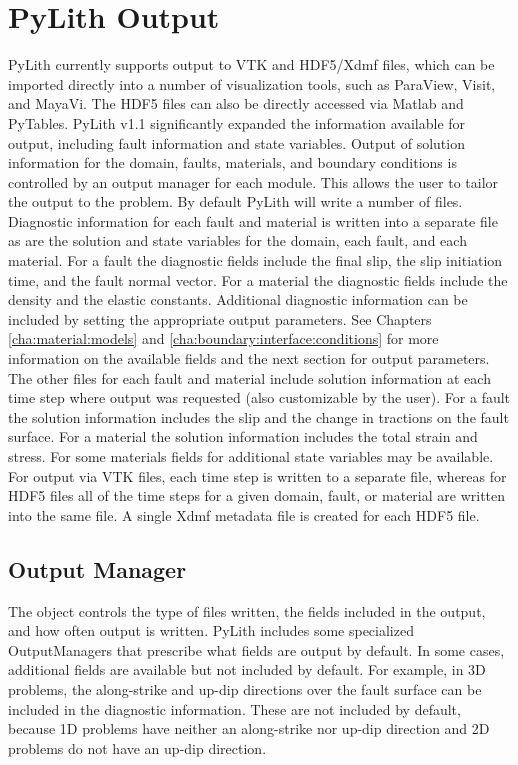 \section{PyLith Output}

PyLith currently supports output to VTK and HDF5/Xdmf files, which
can be imported directly into a number of visualization tools, such
as ParaView, Visit, and MayaVi. The HDF5 files can also be directly
accessed via Matlab and PyTables. PyLith v1.1 significantly expanded
the information available for output, including fault information
and state variables. Output of solution information for the domain,
faults, materials, and boundary conditions is controlled by an output
manager for each module. This allows the user to tailor the output
to the problem. By default PyLith will write a number of files. Diagnostic
information for each fault and material is written into a separate
file as are the solution and state variables for the domain, each
fault, and each material. For a fault the diagnostic fields include
the final slip, the slip initiation time, and the fault normal vector.
For a material the diagnostic fields include the density and the elastic
constants. Additional diagnostic information can be included by setting
the appropriate output parameters. See Chapters \vref{cha:material:models}
and \vref{cha:boundary:interface:conditions} for more information
on the available fields and the next section for output parameters.
The other files for each fault and material include solution information
at each time step where output was requested (also customizable by
the user). For a fault the solution information includes the slip
and the change in tractions on the fault surface. For a material the
solution information includes the total strain and stress. For some
materials fields for additional state variables may be available.
For output via VTK files, each time step is written to a separate
file, whereas for HDF5 files all of the time steps for a given domain,
fault, or material are written into the same file. A single Xdmf metadata
file is created for each HDF5 file.


\subsection{Output Manager}

The  object controls the type of files written, the fields
included in the output, and how often output is written. PyLith includes
some specialized OutputManagers that prescribe what fields are output
by default. In some cases, additional fields are available but not
included by default. For example, in 3D problems, the along-strike
and up-dip directions over the fault surface can be included in the
diagnostic information. These are not included by default, because
1D problems have neither an along-strike nor up-dip direction and
2D problems do not have an up-dip direction.


